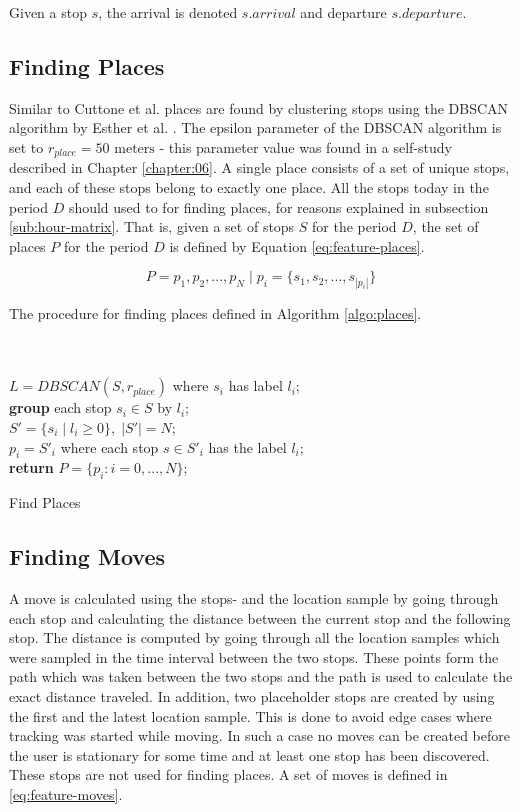 Given a stop $s$, the arrival is denoted $s.arrival$ and departure $s.departure$.

\subsection{Finding Places}
Similar to Cuttone et al. places are found by clustering stops using the DBSCAN algorithm by Esther et al. \cite{density-based-1996}. The epsilon parameter of the DBSCAN algorithm is set to $r_{place} = 50 \text{ meters}$ - this parameter value was found in a self-study described in Chapter \ref{chapter:06}. A single place consists of a set of unique stops, and each of these stops belong to exactly one place. All the stops today in the period $D$ should used to for finding places, for reasons explained in subsection \ref{sub:hour-matrix}. That is, given a set of stops $S$ for the period $D$, the set of places $P$ for the period $D$ is defined by Equation \eqref{eq:feature-places}. 

\begin{equation}
\label{eq:feature-places}
P = {p_1, p_2, ..., p_N} \;|\; p_i = \{s_1, s_2, ..., s_{|p_i|}\}
\end{equation}

 
The procedure for finding places defined in Algorithm \ref{algo:places}.

\begin{algorithm}[H]
\SetAlgoLined
{}\\
\\
    $L = DBSCAN(S, r_{place})$ where $s_i$ has label $l_i$;\\
    \textbf{group} each stop $s_i \in S$ by $l_i$;\\
    $S' = \{s_i \;|\; l_i \geq 0\}, \;|S'| = N$;\\
    $p_i = S'_i$ where each stop $s \in S'_i$ has the label $l_i$;\\
    \textbf{return} $P = \{p_i : i = 0, ..., N\}$;\\
 \label{algo:places}
 \caption{Find Places}
\end{algorithm}

\subsection{Finding Moves}
A move is calculated using the stops- and the location sample by going through each stop and calculating the distance between the current stop and the following stop. The distance is computed by going through all the location samples which were sampled in the time interval between the two stops. These points form the path which was taken between the two stops and the path is used to calculate the exact distance traveled. In addition, two placeholder stops are created by using the first and the latest location sample. This is done to avoid edge cases where tracking was started while moving. In such a case no moves can be created before the user is stationary for some time and at least one stop has been discovered. These stops are not used for finding places. A set of moves is defined in \eqref{eq:feature-moves}.

